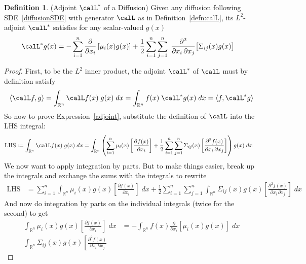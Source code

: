 \documentclass[12pt]{article}
\theoremstyle{plain}
\theoremstyle{definition}
\newtheorem{defn}[thm]{Definition}
\theoremstyle{remark}
\newcommand{\Rn}{\mathbb{R}^n}
\newcommand{\sumin}{\sum^n_{i=1}}
\newcommand{\sumjn}{\sum^n_{j=1}}
\begin{document}
\begin{defn}{(Adjoint $\calL^*$ of a Diffusion)}
Given any diffusion following SDE~\ref{diffusionSDE} with generator
$\calL$ as in Definition~\ref{defn:calL}, its $L^2$-adjoint $\calL^*$
satisfies for any scalar-valued $g(x)$
\begin{align}
  \calL^* g(x)
  &=
  -
  \sumin
  \frac{\partial}{\partial x_i}
  \left[
  \mu_{i}(x)
  g(x)
  \right]
  +
  \frac{1}{2}
  \sumin
  \sumjn
  \;
  \frac{\partial^2}{\partial x_i\,\partial x_j}
  \big[
  \Sigma_{ij}(x)
  g(x)
  \big]
  \label{adjointdefn}
\end{align}
\end{defn}
\begin{proof}
First, to be the $L^2$ inner product, the adjoint $\calL^*$ of $\calL$
must by definition satisfy
\begin{align}
  \langle \calL f, g\rangle
  =
  \int_{\Rn} \calL f(x)\; g(x)\;dx
  =
  \int_{\Rn} f(x)\;\calL^* g(x)\;dx
  =
  \langle f,  \calL^* g\rangle
  \label{adjoint}
\end{align}
So now to prove Expression~\ref{adjoint}, substitute the definition of
$\calL$ into the LHS integral:
\begin{align*}
  \text{LHS} :=
  \int_{\Rn} \calL f(x)\; g(x)\;dx
  &=
  \int_{\Rn}
  \left(
  \sumin
  \mu_{i}(x)
  \left[
  \frac{\partial f(x)}{\partial x_i}
  \right]
  +
  \frac{1}{2}
  \sumin
  \sumjn
  \Sigma_{ij}(x)
  \left[
  \frac{\partial^2 f(x)}{\partial x_i\,\partial x_j}
  \right]
  \right)
  g(x)\;dx
\end{align*}
We now want to apply integration by parts. But to make things easier,
break up the integrals and exchange the sums with the integrals to
rewrite
\begin{align*}
  \text{LHS}
  &=
  \sumin
  \int_{\Rn}
  \mu_{i}(x)
  g(x)
  \left[
  \frac{\partial f(x)}{\partial x_i}
  \right]
  \;dx
  +
  \frac{1}{2}
  \sumin
  \sumjn
  \int_{\Rn}
  \Sigma_{ij}(x)
  g(x)
  \left[
  \frac{\partial^2 f(x)}{\partial x_i\,\partial x_j}
  \right]
  \;dx
\end{align*}
And now do integration by parts on the individual integrals (twice for
the second) to get
\begin{align*}
  \int_{\Rn}
  \mu_{i}(x)
  g(x)
  \left[
  \frac{\partial f(x)}{\partial x_i}
  \right]
  \;dx
  &=
  -
  \int_{\Rn}
  f(x)
  \frac{\partial}{\partial x_i}
  \left[
  \mu_{i}(x)
  g(x)
  \right]
  \;dx
  \\
  \int_{\Rn}
  \Sigma_{ij}(x)
  g(x)
  \left[
  \frac{\partial^2 f(x)}{\partial x_i\,\partial x_j}

\end{align*}
\end{proof}
\end{document}

